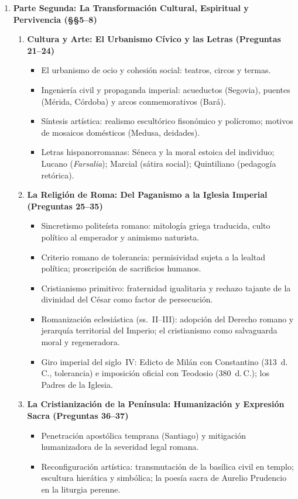 \documentclass[11pt,letterpaper]{article}
\begin{document}
\begin{enumerate}[label=\textbf{\Roman*.}, leftmargin=1.5em, itemsep=0.5em]
  \item \textbf{Parte Segunda: La Transformación Cultural, Espiritual y Pervivencia (§§5--8)}
  \begin{enumerate}[label=\textbf{\Alph*.}, leftmargin=1.4em, itemsep=0.35em]
    \item \textbf{Cultura y Arte: El Urbanismo Cívico y las Letras (Preguntas 21--24)}
    \begin{itemize}[leftmargin=1.2em, itemsep=0.15em]
      \item El urbanismo de ocio y cohesión social: teatros, circos y termas.
      \item Ingeniería civil y propaganda imperial: acueductos (Segovia), puentes (Mérida, Córdoba) y arcos conmemorativos (Bará).
      \item Síntesis artística: realismo escultórico fisonómico y polícromo; motivos de mosaicos domésticos (Medusa, deidades).
      \item Letras hispanorromanas: Séneca y la moral estoica del individuo; Lucano (\emph{Farsalia}); Marcial (sátira social); Quintiliano (pedagogía retórica).
    \end{itemize}

    \item \textbf{La Religión de Roma: Del Paganismo a la Iglesia Imperial (Preguntas 25--35)}
    \begin{itemize}[leftmargin=1.2em, itemsep=0.15em]
      \item Sincretismo politeísta romano: mitología griega traducida, culto político al emperador y animismo naturista.
      \item Criterio romano de tolerancia: permisividad sujeta a la lealtad política; proscripción de sacrificios humanos.
      \item Cristianismo primitivo: fraternidad igualitaria y rechazo tajante de la divinidad del César como factor de persecución.
      \item Romanización eclesiástica (ss.~II--III): adopción del Derecho romano y jerarquía territorial del Imperio; el cristianismo como salvaguarda moral y regeneradora.
      \item Giro imperial del siglo~IV: Edicto de Milán con Constantino (313~d.\,C., tolerancia) e imposición oficial con Teodosio (380~d.\,C.); los Padres de la Iglesia.
    \end{itemize}

    \item \textbf{La Cristianización de la Península: Humanización y Expresión Sacra (Preguntas 36--37)}
    \begin{itemize}[leftmargin=1.2em, itemsep=0.15em]
      \item Penetración apostólica temprana (Santiago) y mitigación humanizadora de la severidad legal romana.
      \item Reconfiguración artística: transmutación de la basílica civil en templo; escultura hierática y simbólica; la poesía sacra de Aurelio Prudencio en la liturgia perenne.
    \end{itemize}


\end{enumerate}
\end{enumerate}
\end{document}
